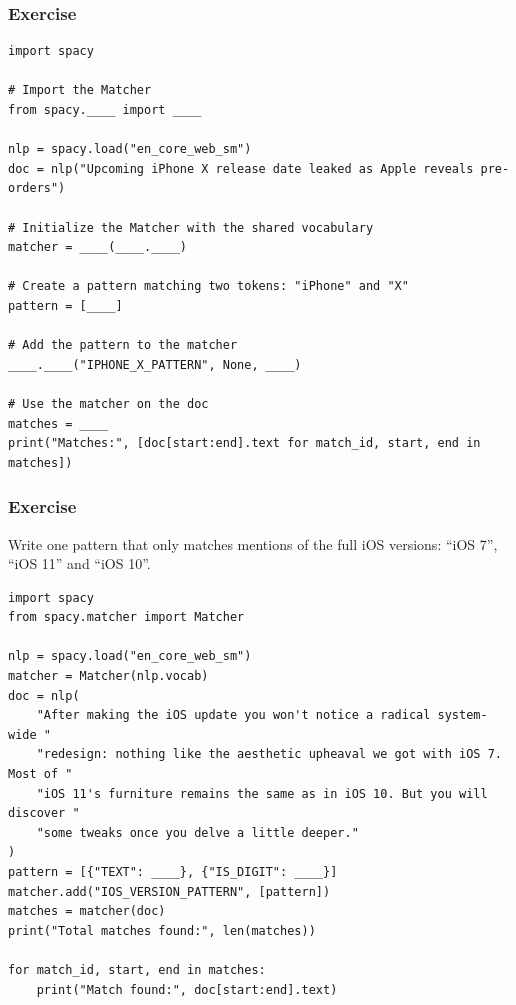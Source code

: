 \begin{frame}[fragile]\frametitle{Exercise}

  \begin{lstlisting}
import spacy

# Import the Matcher
from spacy.____ import ____

nlp = spacy.load("en_core_web_sm")
doc = nlp("Upcoming iPhone X release date leaked as Apple reveals pre-orders")

# Initialize the Matcher with the shared vocabulary
matcher = ____(____.____)

# Create a pattern matching two tokens: "iPhone" and "X"
pattern = [____]

# Add the pattern to the matcher
____.____("IPHONE_X_PATTERN", None, ____)

# Use the matcher on the doc
matches = ____
print("Matches:", [doc[start:end].text for match_id, start, end in matches])

  \end{lstlisting}
	
\end{frame}

\begin{frame}[fragile]\frametitle{Exercise}

Write one pattern that only matches mentions of the full iOS versions: “iOS 7”, “iOS 11” and “iOS 10”.

  \begin{lstlisting}
import spacy
from spacy.matcher import Matcher

nlp = spacy.load("en_core_web_sm")
matcher = Matcher(nlp.vocab)
doc = nlp(
    "After making the iOS update you won't notice a radical system-wide "
    "redesign: nothing like the aesthetic upheaval we got with iOS 7. Most of "
    "iOS 11's furniture remains the same as in iOS 10. But you will discover "
    "some tweaks once you delve a little deeper."
)
pattern = [{"TEXT": ____}, {"IS_DIGIT": ____}]
matcher.add("IOS_VERSION_PATTERN", [pattern])
matches = matcher(doc)
print("Total matches found:", len(matches))

for match_id, start, end in matches:
    print("Match found:", doc[start:end].text)
  \end{lstlisting}
	
\end{frame}



